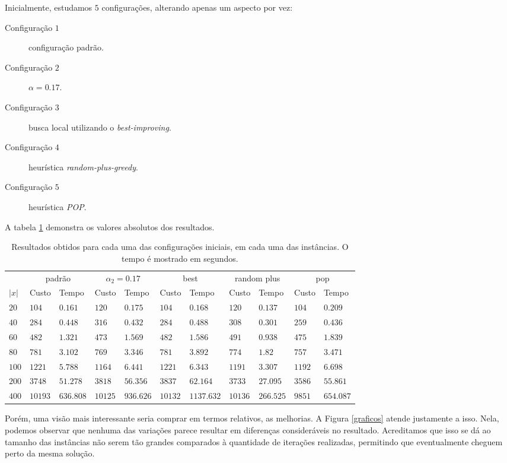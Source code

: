 \documentclass[11pt]{article}
\begin{document}
Inicialmente, estudamos \(5\) configurações, alterando apenas um aspecto por vez:
\begin{description}
\item[{Configuração \(1\)}] configuração padrão.
\item[{Configuração \(2\)}] \(\alpha = 0.17\).
\item[{Configuração \(3\)}] busca local utilizando o \emph{best-improving}.
\item[{Configuração \(4\)}] heurística \emph{random-plus-greedy}.
\item[{Configuração \(5\)}] heurística \emph{POP}.
\end{description}

A tabela \ref{tabela_resultados} demonstra os valores absolutos dos resultados.

\begin{table}[]
\caption{\label{tabela_resultados}Resultados obtidos para cada uma das configurações iniciais, em cada uma das instâncias. O tempo é mostrado em segundos.}
\begin{tabular}{lllllllllll}
 & \multicolumn{2}{c}{padrão} & \multicolumn{2}{c}{$\alpha_2 = 0.17$} & \multicolumn{2}{c}{best} & \multicolumn{2}{c}{random plus} & \multicolumn{2}{c}{pop} \\ \cline{2-11}
 $|x|$  & Custo  & Tempo   & Custo & Tempo & Custo    & Tempo   & Custo   & Tempo & Custo    & Tempo  \\ \hline
$20$ & $104$ & $0.161$ & $120$ & $0.175$ & $104$ & $0.168$ & $120$ & $0.137$ & $104$ & $0.209$\\
$40$ & $284$ & $0.448$ & $316$ & $0.432$ & $284$ & $0.488$ & $308$ & $0.301$ & $259$ & $0.436$\\
$60$ & $482$ & $1.321$ & $473$ & $1.569$ & $482$ & $1.586$ & $491$ & $0.938$ & $475$ & $1.839$\\
$80$ & $781$ & $3.102$ & $769$ & $3.346$ & $781$ & $3.892$ & $774$ & $1.82$ & $757$ & $3.471$\\
$100$ & $1221$ & $5.788$ & $1164$ & $6.441$ & $1221$ & $6.343$ & $1191$ & $3.307$ & $1192$ & $6.698$\\
$200$ & $3748$ & $51.278$ & $3818$ & $56.356$ & $3837$ & $62.164$ & $3733$ & $27.095$ & $3586$ & $55.861$\\
$400$ & $10193$ & $636.808$ & $10125$ & $936.626$ & $10132$ & $1137.632$ & $10136$ & $266.525$ & $9851$ & $654.087$
\end{tabular}
\end{table}

Porém, uma visão mais interessante seria comprar em termos relativos, as melhorias. A Figura \ref{graficos} atende justamente a isso. Nela, podemos observar que nenhuma das variações parece resultar em diferenças consideráveis no resultado. Acreditamos que isso se dá ao tamanho das instâncias não serem tão grandes comparados à quantidade de iterações realizadas, permitindo que eventualmente cheguem perto da mesma solução.
\end{document}
